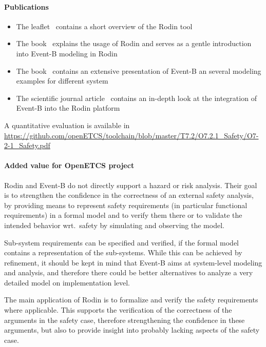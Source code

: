 \paragraph{Publications}

\begin{itemize}
\item The leaflet~\cite{RodinLeaflet} contains a short overview of the Rodin
  tool
\item The book~\cite{RodinHandbook} explains the usage of Rodin and serves as a
  gentle introduction into Event-B modeling in Rodin
\item The book~\cite{Abrial:2010:MES:1855020} contains an extensive presentation
  of Event-B an several modeling examples for different system
\item The scientific journal article~\cite{AbrialBHHMV10} contains an in-depth
  look at the integration of Event-B into the Rodin platform
\end{itemize}



A quantitative evaluation is available in \url{https://github.com/openETCS/toolchain/blob/master/T7.2/O7.2.1_Safety/O7-2-1_Safety.pdf}

\paragraph{Added value for OpenETCS project}

  Rodin and Event-B do not directly support a hazard or risk analysis. Their
  goal is to strengthen the confidence in the correctness of an external safety
  analysis, by providing means to represent safety requirements (in particular
  functional requirements) in a formal model and to verify them there or to
  validate the intended behavior wrt.\ safety by simulating and observing the
  model.

  Sub-system requirements can be specified and verified, if the formal model
  contains a representation of the sub-systems. While this can be achieved by
  refinement, it should be kept in mind that Event-B aims at system-level
  modeling and analysis, and therefore there could be better alternatives to
  analyze a very detailed model on implementation level.

  The main application of Rodin is to formalize and verify the safety
  requirements where applicable. This supports the verification of the
  correctness of the arguments in the safety case, therefore strengthening the
  confidence in these arguments, but also to provide insight into probably
  lacking aspects of the safety case.

